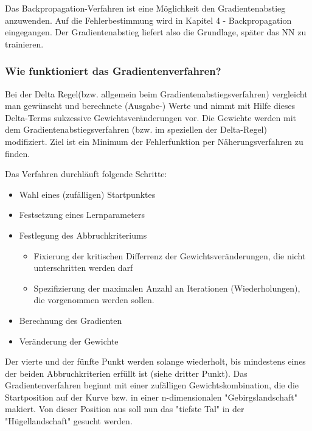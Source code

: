   Das Backpropagation-Verfahren ist eine Möglichkeit den Gradientenabstieg anzuwenden. Auf die Fehlerbestimmung wird in Kapitel 4 - Backpropagation eingegangen. Der Gradientenabstieg liefert also die Grundlage, später das NN zu trainieren.

\subsubsection{Wie funktioniert das Gradientenverfahren?}\label{subsec:gradientenverfahren:wie_funktioniert}
  Bei der Delta Regel(bzw. allgemein beim Gradientenabstiegsverfahren) vergleicht man gewünscht und berechnete (Ausgabe-) Werte und nimmt mit Hilfe dieses Delta-Terms sukzessive
  Gewichtsveränderungen vor. Die Gewichte werden mit dem Gradientenabstiegsverfahren (bzw. im speziellen der Delta-Regel) modifiziert. Ziel ist ein Minimum der Fehlerfunktion per Näherungsverfahren zu finden.

  Das Verfahren durchläuft folgende Schritte:
  \begin{itemize}
    \item Wahl eines (zufälligen) Startpunktes
  \end{itemize}
  \begin{itemize}
    \item Festsetzung eines Lernparameters
  \end{itemize}
  \begin{itemize}
    \item Festlegung des Abbruchkriteriums
    \begin{itemize}
    \item Fixierung der kritischen Differrenz der Gewichtsveränderungen, die nicht unterschritten werden darf
    \item Spezifizierung der maximalen Anzahl an Iterationen (Wiederholungen), die vorgenommen werden sollen.
    \end{itemize}
  \end{itemize}
  \begin{itemize}
    \item  Berechnung des Gradienten
  \end{itemize}
  \begin{itemize}
    \item Veränderung der Gewichte
  \end{itemize}

  Der vierte und der fünfte Punkt werden solange wiederholt, bis mindestens eines der beiden Abbruchkriterien erfüllt ist (siehe dritter Punkt).
  Das Gradientenverfahren beginnt mit einer zufälligen Gewichtskombination, die die Startposition auf der Kurve bzw. in einer n-dimensionalen "Gebirgslandschaft" makiert.
  Von dieser Position aus soll nun das "tiefste Tal" in der "Hügellandschaft" gesucht werden.\cite{GR10}
  


